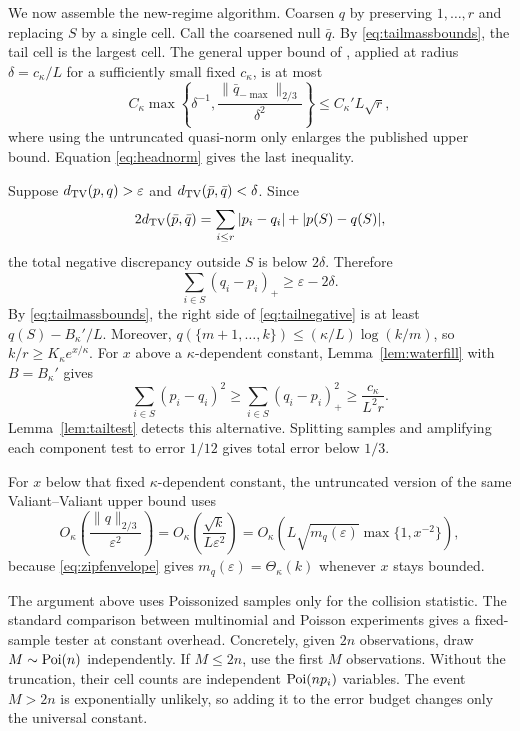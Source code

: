 We now assemble the new-regime algorithm. Coarsen $q$ by preserving
$1,\ldots,r$ and replacing $S$ by a single cell. Call the coarsened null
$\bar q$. By \eqref{eq:tailmassbounds}, the tail cell is the largest cell.
The general upper bound of \citet[Theorem 2]{valiant2017automatic}, applied
at radius $\delta=c_\kappa/L$ for a sufficiently small fixed
$c_\kappa$, is at most
\[
 C_\kappa\max\left\{\delta^{-1},
 \frac{\|\bar q_{-\max}\|_{2/3}}{\delta^2}\right\}
 \leq C_\kappa'L\sqrt r,                                \tag{34}\label{eq:coarsebound}
\]
where using the untruncated quasi-norm only enlarges the published upper
bound. Equation \eqref{eq:headnorm} gives the last inequality.

Suppose $d_{\mathrm{TV}}(p,q)>\varepsilon$ and
$d_{\mathrm{TV}}(\bar p,\bar q)<\delta$. Since
\[
 2d_{\mathrm{TV}}(\bar p,\bar q)
 =\sum_{i\leq r}|p_i-q_i|+|p(S)-q(S)|,
\]
the total negative discrepancy outside $S$ is below $2\delta$. Therefore
\[
 \sum_{i\in S}(q_i-p_i)_+
 \geq\varepsilon-2\delta.                               \tag{35}\label{eq:tailnegative}
\]
By \eqref{eq:tailmassbounds}, the right side of
\eqref{eq:tailnegative} is at least $q(S)-B_\kappa'/L$. Moreover,
$q(\{m+1,\ldots,k\})\leq(\kappa/L)\log(k/m)$, so
$k/r\geq K_\kappa e^{x/\kappa}$. For $x$ above a
$\kappa$-dependent constant, Lemma~\ref{lem:waterfill} with
$B=B_\kappa'$ gives
\[
 \sum_{i\in S}(p_i-q_i)^2
 \geq\sum_{i\in S}(q_i-p_i)_+^2
 \geq\frac{c_\kappa}{L^2r}.                             \tag{36}\label{eq:tailsignalappendix}
\]
Lemma~\ref{lem:tailtest} detects this alternative. Splitting samples and
amplifying each component test to error $1/12$ gives total error below
$1/3$.

For $x$ below that fixed $\kappa$-dependent constant, the untruncated
version of the same Valiant--Valiant upper bound
uses
\[
 O_\kappa\left(\frac{\|q\|_{2/3}}{\varepsilon^2}\right)
 =O_\kappa\left(\frac{\sqrt k}{L\varepsilon^2}\right)
 =O_\kappa\left(L\sqrt{m_q(\varepsilon)}
     \max\{1,x^{-2}\}\right),                         \tag{37}\label{eq:smallupperappendix}
\]
because \eqref{eq:zipfenvelope} gives
$m_q(\varepsilon)=\Theta_\kappa(k)$ whenever $x$ stays bounded.

The argument above uses Poissonized samples only for the collision statistic.
The standard comparison between multinomial and Poisson experiments gives a
fixed-sample tester at constant overhead. Concretely, given $2n$ observations,
draw $M\sim\operatorname{Poi}(n)$ independently. If $M\leq2n$, use the first $M$
observations. Without the truncation, their cell counts are independent
$\operatorname{Poi}(np_i)$ variables. The event $M>2n$ is exponentially unlikely, so adding
it to the error budget changes only the universal constant.

